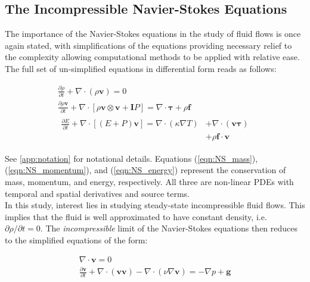 \documentclass[final,3p,times,twocolumn]{elsarticle}
\begin{document}
\subsection{The Incompressible Navier-Stokes Equations}
The importance of the Navier-Stokes equations in the study of fluid flows is once again stated, with simplifications of the equations providing necessary relief to the complexity allowing computational methods to be applied with relative ease. The full set of un-simplified equations in differential form reads as follows:

\begin{gather}
    \frac{\partial \rho}{\partial t} + \nabla \cdot (\rho \mathbf{v}) = 0 \label{eqn:NS_mass}
    \\ 
    \frac{\partial \rho \mathbf{v}}{\partial t} + \nabla \cdot [\rho \mathbf{v} \otimes \mathbf{v} + \mathbf{I}P] = \nabla \cdot \mathbf{\tau} + \rho \mathbf{f} \label{eqn:NS_momentum}
    \\
    \begin{split}
        \frac{\partial E}{\partial t} + \nabla \cdot [(E+P)\mathbf{v}] = \nabla \cdot (\kappa \nabla T) &+ \nabla \cdot (\mathbf{v \tau}) \\ &+ \rho \mathbf{f} \cdot \mathbf{v}
    \end{split}
    \label{eqn:NS_energy}
\end{gather}


See \ref{app:notation} for notational details. Equations (\ref{eqn:NS_mass}), (\ref{eqn:NS_momentum}), and (\ref{eqn:NS_energy})  represent the conservation of mass, momentum, and energy, respectively. All three are non-linear PDEs with temporal and spatial derivatives and source terms. \\ In this study, interest lies in studying steady-state incompressible fluid flows. This implies that the fluid is well approximated to have constant density, i.e. $\partial \rho / \partial t = 0$. The \textit{incompressible} limit of the Navier-Stokes equations then reduces to the simplified equations of the form:

\begin{gather}
\nabla \cdot \mathbf{v} = 0
\label{eqn:INS_mass} \\
\frac{\partial \mathbf{v}}{\partial t} + \nabla \cdot (\mathbf{v} \mathbf{v}) - \nabla \cdot (\nu \nabla \mathbf{v}) = -\nabla p + \mathbf{g}
\label{eqn:INS_momentum}
\end{gather}
\end{document}

